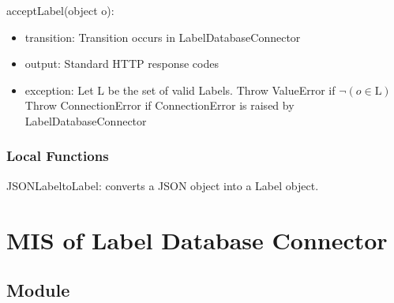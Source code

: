 \documentclass[12pt, titlepage]{article}
\begin{document}
  \noindent acceptLabel(object o):
  \begin{itemize}
  \item transition: Transition occurs in LabelDatabaseConnector
  \item output: Standard HTTP response codes
  \item exception: Let L be the set of valid Labels. Throw ValueError if $\neg (o \in \text{L})$\\
  Throw ConnectionError if ConnectionError is raised by LabelDatabaseConnector
  \end{itemize}
  
  
  
  \subsubsection{Local Functions}

  JSONLabeltoLabel: converts a JSON object into a Label object. 
  

\newpage


\section{MIS of Label Database Connector}\label{label database connector}
  
  
  
  \subsection{Module}
  
\end{document}
